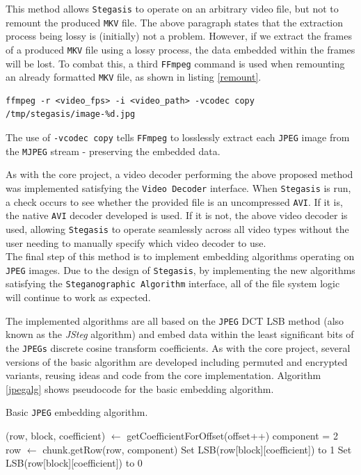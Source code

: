 \documentclass[paper=a4, fontsize=11pt,twoside]{scrartcl}    %
\numberwithin{table}{section}
\numberwithin{figure}{section}
\numberwithin{algorithm}{section}
\begin{document}
This method allows \texttt{Stegasis} to operate on an arbitrary video file, but not to remount the produced \texttt{MKV} file. The above paragraph states that the extraction process being lossy is (initially) not a problem. However, if we extract the frames of a produced \texttt{MKV} file using a lossy process, the data embedded within the frames will be lost. To combat this, a third \texttt{FFmpeg} command is used when remounting an already formatted \texttt{MKV} file, as shown in listing \ref{remount}.

\begin{lstlisting}[caption={\texttt{FFmpeg} \texttt{MKV} \texttt{MJPEG} fram extraction command.}, frame=single, label=remount,upquote=true]
ffmpeg -r <video_fps> -i <video_path> -vcodec copy /tmp/stegasis/image-%d.jpg
\end{lstlisting}

The use of \texttt{-vcodec copy} tells \texttt{FFmpeg} to losslessly extract each \texttt{JPEG} image from the \texttt{MJPEG} stream - preserving the embedded data.

As with the core project, a video decoder performing the above proposed method was implemented satisfying the \texttt{Video Decoder} interface. When \texttt{Stegasis} is run, a check occurs to see whether the provided file is an uncompressed \texttt{AVI}. If it is, the native \texttt{AVI} decoder developed is used. If it is not, the above video decoder is used, allowing \texttt{Stegasis} to operate seamlessly across all video types without the user needing to manually specify which video decoder to use.\\

\noindent
The final step of this method is to implement embedding algorithms operating on \texttt{JPEG} images. Due to the design of \texttt{Stegasis}, by implementing the new algorithms satisfying the \texttt{Steganographic Algorithm} interface, all of the file system logic will continue to work as expected.

The implemented algorithms are all based on the \texttt{JPEG} DCT LSB method (also known as the \textit{JSteg} algorithm) and embed data within the least significant bits of the \texttt{JPEGs} discrete cosine transform coefficients. As with the core project, several versions of the basic algorithm are developed including permuted and encrypted variants, reusing ideas and code from the core implementation. Algorithm \ref{jpegalg} shows pseudocode for the basic embedding algorithm.

\begin{algorithm}
\caption{Basic \texttt{JPEG} embedding algorithm.}
\label{jpegalg}
\begin{algorithmic}[1]
		\State (row, block, coefficient) $\gets$ getCoefficientForOffset(offset++)
		\State component = 2
		\State row $\gets$ chunk.getRow(row, component)
			\State Set LSB(row[block][coefficient]) to 1
		\Else
			\State Set LSB(row[block][coefficient]) to 0
		\EndIf
	\EndFor
\EndFor
\end{algorithmic}
\end{algorithm}
\end{document}
